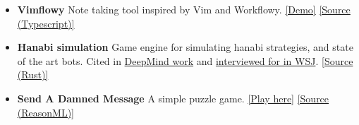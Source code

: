 \documentclass[11 pt]{article}
\begin{document}
\begin{itemize}
\item \textbf{Vimflowy}
Note taking tool inspired by Vim and Workflowy. \href{https://www.wuthejeff.com/vimflowy}{[Demo]} \href{https://github.com/WuTheFWasThat/vimflowy}{[Source (Typescript)]}

\item \textbf{Hanabi simulation}
Game engine for simulating hanabi strategies, and state of the art bots.  Cited in \href{https://arxiv.org/abs/1902.00506}{DeepMind work} and \href{https://www.wsj.com/articles/why-the-card-game-hanabi-is-the-next-big-hurdle-for-artificial-intelligence-11553875351}{interviewed for in WSJ}. \href{https://github.com/WuTheFWasThat/hanabi.rs}{[Source (Rust)]}



\item \textbf{Send A Damned Message}
  A simple puzzle game.
\href{https://www.wuthejeff.com/send-a-damned-message}{[Play here]}
\href{https://github.com/WuTheFWasThat/send-a-damned-message}{[Source (ReasonML)]}





\end{itemize}
\end{document}
